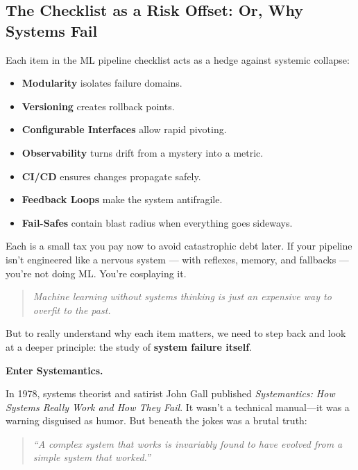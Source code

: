 \medskip

\subsection{The Checklist as a Risk Offset: Or, Why Systems Fail}

Each item in the ML pipeline checklist acts as a hedge against systemic collapse:

\begin{itemize}
    \item \textbf{Modularity} isolates failure domains.
    \item \textbf{Versioning} creates rollback points.
    \item \textbf{Configurable Interfaces} allow rapid pivoting.
    \item \textbf{Observability} turns drift from a mystery into a metric.
    \item \textbf{CI/CD} ensures changes propagate safely.
    \item \textbf{Feedback Loops} make the system antifragile.
    \item \textbf{Fail-Safes} contain blast radius when everything goes sideways.
\end{itemize}

Each is a small tax you pay now to avoid catastrophic debt later. If your pipeline isn’t engineered like a nervous system — with reflexes, memory, and fallbacks — you’re not doing ML. You’re cosplaying it.

\medskip

\begin{quote}
\textit{Machine learning without systems thinking is just an expensive way to overfit to the past.}
\end{quote}

\medskip

But to really understand why each item matters, we need to step back and look at a deeper principle:  
the study of \textbf{system failure itself}.

\textbf{Enter Systemantics.}

In 1978, systems theorist and satirist John Gall published \textit{Systemantics: How Systems Really Work and How They Fail}.  
It wasn’t a technical manual—it was a warning disguised as humor. But beneath the jokes was a brutal truth:  
\begin{quote}
\textit{“A complex system that works is invariably found to have evolved from a simple system that worked.”}
\end{quote}

